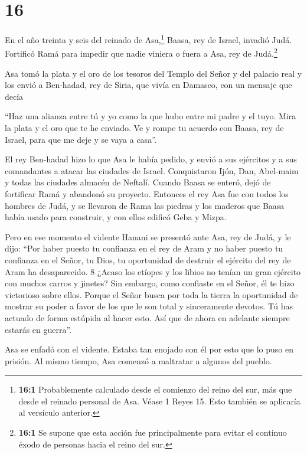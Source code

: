 \hypertarget{section-15}{%
\section{16}\label{section-15}}

 En el año treinta y seis del reinado de Asa,\footnote{\textbf{16:1}
  Probablemente calculado desde el comienzo del reino del sur, más que
  desde el reinado personal de Asa. Véase 1 Reyes 15. Esto también se
  aplicaría al versículo anterior.} Baasa, rey de Israel, invadió Judá.
Fortificó Ramá para impedir que nadie viniera o fuera a Asa, rey de
Judá.\footnote{\textbf{16:1} Se supone que esta acción fue
  principalmente para evitar el continuo éxodo de personas hacia el
  reino del sur.}

 Asa tomó la plata y el oro de los tesoros del Templo del
Señor y del palacio real y los envió a Ben-hadad, rey de Siria, que
vivía en Damasco, con un mensaje que decía

 ``Haz una alianza entre tú y yo como la que hubo entre mi
padre y el tuyo. Mira la plata y el oro que te he enviado. Ve y rompe tu
acuerdo con Baasa, rey de Israel, para que me deje y se vaya a casa''.

 El rey Ben-hadad hizo lo que Asa le había pedido, y envió a
sus ejércitos y a sus comandantes a atacar las ciudades de Israel.
Conquistaron Ijón, Dan, Abel-maim y todas las ciudades almacén de
Neftalí.  Cuando Baasa se enteró, dejó de fortificar Ramá y
abandonó su proyecto.  Entonces el rey Asa fue con todos los
hombres de Judá, y se llevaron de Rama las piedras y los maderos que
Baasa había usado para construir, y con ellos edificó Geba y Mizpa.

 Pero en ese momento el vidente Hanani se presentó ante Asa,
rey de Judá, y le dijo: ``Por haber puesto tu confianza en el rey de
Aram y no haber puesto tu confianza en el Señor, tu Dios, tu oportunidad
de destruir el ejército del rey de Aram ha desaparecido. 8 ¿Acaso los
etíopes y los libios no tenían un gran ejército con muchos carros y
jinetes? Sin embargo, como confiaste en el Señor, él te hizo victorioso
sobre ellos.  Porque el Señor busca por toda la tierra la
oportunidad de mostrar su poder a favor de los que le son total y
sinceramente devotos. Tú has actuado de forma estúpida al hacer esto.
Así que de ahora en adelante siempre estarás en guerra''.

 Asa se enfadó con el vidente. Estaba tan enojado con él
por esto que lo puso en prisión. Al mismo tiempo, Asa comenzó a
maltratar a algunos del pueblo.

